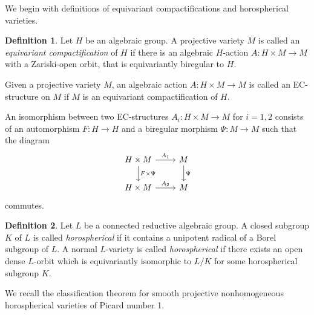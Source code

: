 \documentclass{amsart}
\theoremstyle{definition}
\newtheorem{definition}{Definition}
\theoremstyle{remark}
\begin{document}
We begin with definitions of equivariant compactifications and horospherical varieties.

\begin{definition}
Let \(H\) be an algebraic group. A projective variety \(M\) is called an \textit{equivariant compactification} of \(H\) if there is an algebraic \(H\)-action \(A: H \times M \to M\) with a Zariski-open orbit, that is equivariantly biregular to \(H\).

Given a projective variety \(M\), an algebraic action $A:H \times M \to M$ is called an EC-structure on \(M\) if $M$ is an equivariant compactification of $H$.

An isomorphism between two EC-structures \(A_i : H \times M \to M\) for \(i=1,2\) consists of an automorphism \(F : H \to H\) and a biregular morphism \(\Psi : M \to M\) such that the diagram
\[
\begin{tikzcd}
H \times M \arrow[r, "A_1"] \arrow[d, "F\times \Psi"]
  & M \arrow[d, "\Psi"] \\
H \times M \arrow[r, "A_2"]
  & M
\end{tikzcd}
\]
commutes.
\end{definition}

\begin{definition}
Let $L$ be a connected reductive algebraic group. A closed subgroup $K$ of $L$ is called \textit{horospherical} if it contains a unipotent radical of a Borel subgroup of $L$. A normal $L$-variety is called \textit{horospherical} if there exists an open dense $L$-orbit which is equivariantly isomorphic to $L/K$ for some horospherical subgroup $K$. 
\end{definition}


We recall the classification theorem for smooth projective nonhomogeneous horospherical varieties of Picard number 1.
\end{document}
